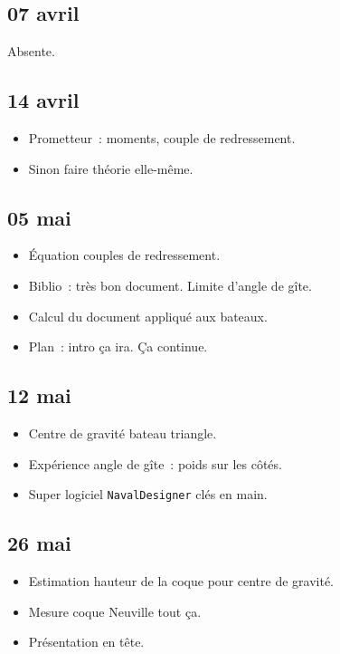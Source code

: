\documentclass[a4paper, 11pt, final, garamond]{book}
\begin{document}
\subsection{07 avril}
\begin{center}
    Absente.
\end{center}

\subsection{14 avril}
\begin{itemize}
  \item Prometteur~: moments, couple de redressement.
  \item Sinon faire théorie elle-même.
\end{itemize}

\subsection{05 mai}
\begin{itemize}
  \item Équation couples de redressement.
  \item Biblio~: très bon document. Limite d'angle de gîte.
  \item Calcul du document appliqué aux bateaux.
  \item Plan~: intro ça ira. Ça continue.
\end{itemize}

\subsection{12 mai}
\begin{itemize}
  \item Centre de gravité bateau triangle.
  \item Expérience angle de gîte~: poids sur les côtés.
  \item Super logiciel \texttt{NavalDesigner} clés en main.
\end{itemize}

\subsection{26 mai}
\begin{itemize}
  \item Estimation hauteur de la coque pour centre de gravité.
  \item Mesure coque Neuville tout ça.
  \item Présentation en tête.
\end{itemize}
\end{document}
